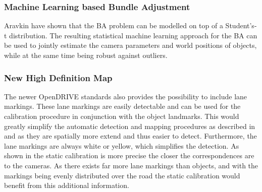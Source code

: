 \subsubsection{Machine Learning based Bundle Adjustment}
Aravkin \etal \cite{students_t_bundle_adjustment} have shown that the BA problem can be modelled on top of a Student's-t distribution. 
The resulting statistical machine learning approach for the BA can be used to jointly estimate the camera parameters and world positions of objects, while at the same time being robust against outliers.
  
\subsubsection{New High Definition Map}
The newer OpenDRIVE standards also provides the possibility to include lane markings.
These lane markings are easily detectable and can be used for the calibration procedure in conjunction with the object landmarks.
This would greatly simplify the automatic detection and mapping procedures as described in  and  as they are spatially more extend and thus easier to detect.
Furthermore, the lane markings are always white or yellow, which simplifies the detection.
As shown in  the static calibration is more precise the closer the correspondences are to the cameras. 
As there exists far more lane markings than objects, and with the markings being evenly distributed over the road the static calibration would benefit from this additional information.